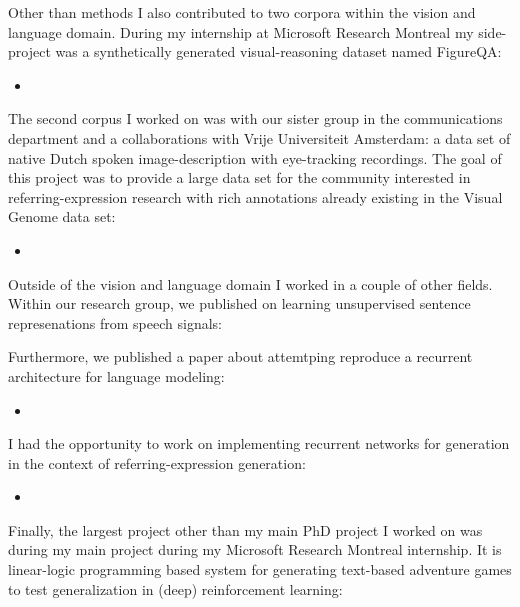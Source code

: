 Other than methods I also contributed to two corpora within the vision and language domain.
During my internship at Microsoft Research Montreal my side-project was a synthetically generated visual-reasoning
dataset named FigureQA:

\begin{itemize}
\item {}
\end{itemize}

The second corpus I worked on was with our sister group in the communications department and a collaborations with 
Vrije Universiteit Amsterdam:  a data set of native Dutch spoken image-description with eye-tracking recordings.
The goal of this project was to provide a large data set for the community interested in referring-expression research
with rich annotations already existing in the Visual Genome data set:

\begin{itemize}
\item {}
\end{itemize}

Outside of the vision and language domain I worked in a couple of other fields.
Within our research group, we published on learning unsupervised sentence represenations
from speech signals:

\item {}

Furthermore, we published a paper about attemtping reproduce a 
recurrent architecture for language modeling:

\begin{itemize}
\item {}
\end{itemize}

I had the opportunity to work on implementing recurrent networks for
generation in the context of referring-expression generation:

\begin{itemize}
\item {}
\end{itemize}

Finally, the largest project other than my main PhD project I worked
on was during my main project during my Microsoft Research Montreal internship.
It is linear-logic programming based system for 
generating text-based adventure games to test
generalization in (deep) reinforcement learning:

